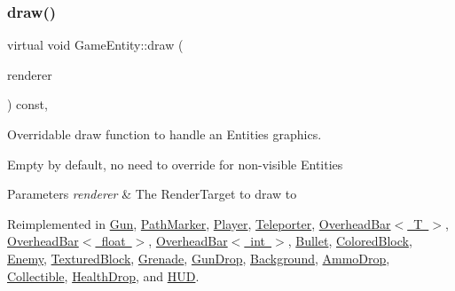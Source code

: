 \subsubsection{\texorpdfstring{draw()}{draw()}}
{\footnotesize\ttfamily virtual void Game\+Entity\+::draw (\begin{DoxyParamCaption}\item[{\mbox{\hyperlink{classsf_1_1_render_target}{sf\+::\+Render\+Target}} \&}]{renderer }\end{DoxyParamCaption}) const\hspace{0.3cm}{\ttfamily [inline]}, {\ttfamily [virtual]}}



Overridable draw function to handle an Entities graphics. 

Empty by default, no need to override for non-\/visible Entities


\begin{DoxyParams}{Parameters}
{\em renderer} & The Render\+Target to draw to \\
\hline
\end{DoxyParams}


Reimplemented in \mbox{\hyperlink{class_gun_a7944c121dad08710e89c4b118c790b11}{Gun}}, \mbox{\hyperlink{class_path_marker_a8dae7801545e5cea55285af8e55d9888}{Path\+Marker}}, \mbox{\hyperlink{class_player_aa89ab3b084fe95cb2f83e34b8163b126}{Player}}, \mbox{\hyperlink{class_teleporter_a621bb8c380bf14910c18753ed7c25750}{Teleporter}}, \mbox{\hyperlink{class_overhead_bar_aea7d4256cfe835b2e150e4e6689a4236}{Overhead\+Bar$<$ T $>$}}, \mbox{\hyperlink{class_overhead_bar_aea7d4256cfe835b2e150e4e6689a4236}{Overhead\+Bar$<$ float $>$}}, \mbox{\hyperlink{class_overhead_bar_aea7d4256cfe835b2e150e4e6689a4236}{Overhead\+Bar$<$ int $>$}}, \mbox{\hyperlink{class_bullet_a5b245a34c66d03693318a801703d76eb}{Bullet}}, \mbox{\hyperlink{class_colored_block_a406ca632f6b5a45b8f88de0ba3ab9b43}{Colored\+Block}}, \mbox{\hyperlink{class_enemy_a909cfc93e50506d0e2c62e5fd231e05a}{Enemy}}, \mbox{\hyperlink{class_textured_block_a2c8d3fa594f02632bba0c7d54909c988}{Textured\+Block}}, \mbox{\hyperlink{class_grenade_abfdaf27e6b0182fe6f515cbdd86be1a8}{Grenade}}, \mbox{\hyperlink{class_gun_drop_a418a09a73fbb7e710065c8a2c525a866}{Gun\+Drop}}, \mbox{\hyperlink{class_background_a888accdc54e970a758fdd6b8e96f97fa}{Background}}, \mbox{\hyperlink{class_ammo_drop_ab0c9da24a8f8c47b679705bed1b24cff}{Ammo\+Drop}}, \mbox{\hyperlink{class_collectible_a4bd92e0f368cd712b86e3ebabc3599f1}{Collectible}}, \mbox{\hyperlink{class_health_drop_a6df6c3fb2e0509cd550420ed35a8fa12}{Health\+Drop}}, and \mbox{\hyperlink{class_h_u_d_a9e27d1929b86f3cf30144aaf602e427d}{H\+UD}}.

